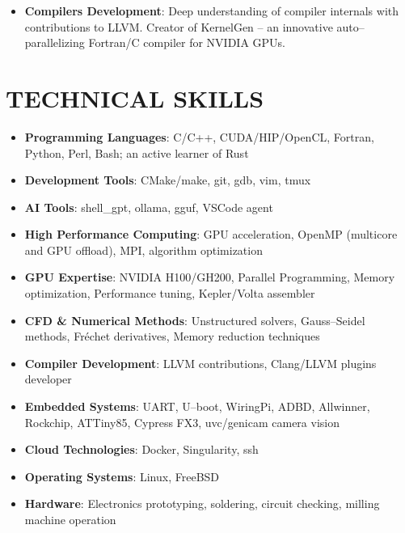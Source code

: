 \documentclass[a4paper]{moderncv}
\begin{document}
\begin{itemize}
\item \textbf{Compilers Development}: Deep understanding of compiler internals with contributions to LLVM. Creator of KernelGen -- an innovative auto--parallelizing Fortran/C compiler for NVIDIA GPUs.
\end{itemize}


\section{TECHNICAL SKILLS}

\begin{itemize}
\item \textbf{Programming Languages}: C/C++, CUDA/HIP/OpenCL, Fortran, Python, Perl, Bash; an active learner of Rust
\item \textbf{Development Tools}: CMake/make, git, gdb, vim, tmux
\item \textbf{AI Tools}: shell\_gpt, ollama, gguf, VSCode agent
\item \textbf{High Performance Computing}: GPU acceleration, OpenMP (multicore and GPU offload), MPI, algorithm optimization
\item \textbf{GPU Expertise}: NVIDIA H100/GH200, Parallel Programming, Memory optimization, Performance tuning, Kepler/Volta assembler
\item \textbf{CFD \& Numerical Methods}: Unstructured solvers, Gauss--Seidel methods, Fréchet derivatives, Memory reduction techniques
\item \textbf{Compiler Development}: LLVM contributions, Clang/LLVM plugins developer
\item \textbf{Embedded Systems}: UART, U--boot, WiringPi, ADBD, Allwinner, Rockchip, ATTiny85, Cypress FX3, uvc/genicam camera vision
\item \textbf{Cloud Technologies}: Docker, Singularity, ssh
\item \textbf{Operating Systems}: Linux, FreeBSD
\item \textbf{Hardware}: Electronics prototyping, soldering, circuit checking, milling machine operation
\end{itemize}
\end{document}
